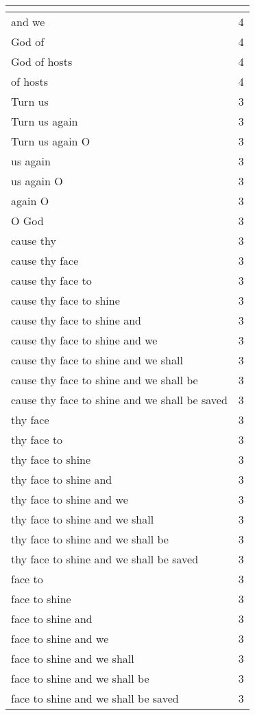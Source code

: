 \begin{center}
\begin{longtable}{|p{3.0in}|p{0.5in}|}
\hline \multicolumn{2}{c}{{ }} \\ \hline
\endfoot 
and we & 4\\ \hline 
God of & 4\\ \hline 
God of hosts & 4\\ \hline 
of hosts & 4\\ \hline 
Turn us & 3\\ \hline 
Turn us again & 3\\ \hline 
Turn us again O & 3\\ \hline 
us again & 3\\ \hline 
us again O & 3\\ \hline 
again O & 3\\ \hline 
O God & 3\\ \hline 
cause thy & 3\\ \hline 
cause thy face & 3\\ \hline 
cause thy face to & 3\\ \hline 
cause thy face to shine & 3\\ \hline 
cause thy face to shine and & 3\\ \hline 
cause thy face to shine and we & 3\\ \hline 
cause thy face to shine and we shall & 3\\ \hline 
cause thy face to shine and we shall be & 3\\ \hline 
cause thy face to shine and we shall be saved & 3\\ \hline 
thy face & 3\\ \hline 
thy face to & 3\\ \hline 
thy face to shine & 3\\ \hline 
thy face to shine and & 3\\ \hline 
thy face to shine and we & 3\\ \hline 
thy face to shine and we shall & 3\\ \hline 
thy face to shine and we shall be & 3\\ \hline 
thy face to shine and we shall be saved & 3\\ \hline 
face to & 3\\ \hline 
face to shine & 3\\ \hline 
face to shine and & 3\\ \hline 
face to shine and we & 3\\ \hline 
face to shine and we shall & 3\\ \hline 
face to shine and we shall be & 3\\ \hline 
face to shine and we shall be saved & 3\\ \hline 

\end{longtable}
\end{center}
